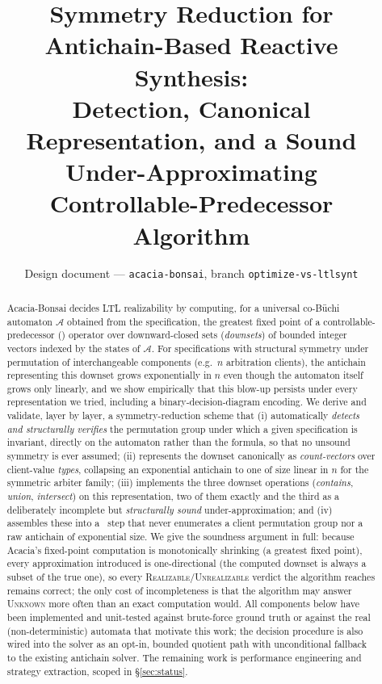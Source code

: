 \documentclass[11pt]{article}
\title{Symmetry Reduction for Antichain-Based Reactive Synthesis:\\
Detection, Canonical Representation, and a Sound\\
Under-Approximating Controllable-Predecessor Algorithm}
\author{Design document --- \texttt{acacia-bonsai}, branch \texttt{optimize-vs-ltlsynt}}
\date{}
\newcommand{\Aut}{\mathcal{A}}
\newcommand{\CPre}{\mathrm{CPre}}
\begin{document}
\maketitle

\begin{abstract}
Acacia-Bonsai decides LTL realizability by computing, for a universal
co-B\"uchi automaton $\Aut$ obtained from the specification, the greatest
fixed point of a controllable-predecessor (\CPre) operator over
downward-closed sets (\emph{downsets}) of bounded integer vectors indexed by
the states of $\Aut$. For specifications with structural symmetry under
permutation of interchangeable components (e.g.\ $n$ arbitration clients),
the antichain representing this downset grows exponentially in $n$ even
though the automaton itself grows only linearly, and we show empirically
that this blow-up persists under every representation we tried, including a
binary-decision-diagram encoding. We derive and validate, layer by layer, a
symmetry-reduction scheme that (i) automatically \emph{detects and
structurally verifies} the permutation group under which a given
specification is invariant, directly on the automaton rather than the
formula, so that no unsound symmetry is ever assumed; (ii) represents the
downset canonically as \emph{count-vectors} over client-value \emph{types},
collapsing an exponential antichain to one of size linear in $n$ for the
symmetric arbiter family; (iii) implements the three downset operations
(\emph{contains}, \emph{union}, \emph{intersect}) on this representation,
two of them exactly and the third as a deliberately incomplete but
\emph{structurally sound} under-approximation; and (iv) assembles these into
a \CPre\ step that never enumerates a client permutation group nor a
raw antichain of exponential size. We give the soundness argument in full:
because Acacia's fixed-point computation is monotonically shrinking (a
greatest fixed point), every approximation introduced is one-directional
(the computed downset is always a subset of the true one), so every
\textsc{Realizable}/\textsc{Unrealizable} verdict the algorithm reaches
remains correct; the only cost of incompleteness is that the algorithm may
answer \textsc{Unknown} more often than an exact computation would. All
components below have been implemented and unit-tested against brute-force
ground truth or against the real (non-deterministic) automata that motivate
this work; the decision procedure is also wired into the solver as an
opt-in, bounded quotient path with unconditional fallback to the existing
antichain solver. The remaining work is performance engineering and
strategy extraction, scoped in \S\ref{sec:status}.
\end{abstract}
\end{document}
